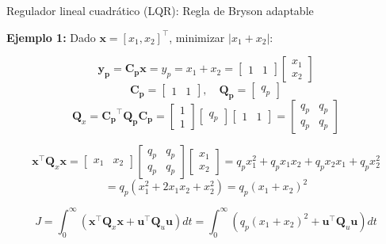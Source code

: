 \documentclass{beamer}
\begin{document}
\begin{frame}{Regulador lineal cuadrático (LQR): Regla de Bryson adaptable}

\textbf{Ejemplo 1:} Dado $\mathbf{x} = [x_1, x_2]^\intercal$, minimizar $|x_1 + x_2|$:

\[
\mathbf{y_p} = \mathbf{C_p} \mathbf{x} = y_p = x_1 + x_2 = \begin{bmatrix}
        1 & 1
    \end{bmatrix}
    \begin{bmatrix}
        x_1 \\ x_2
    \end{bmatrix}
\]
\[
\mathbf{C_p} = \begin{bmatrix}
        1 & 1
    \end{bmatrix}, \quad
\mathbf{Q_p} = \begin{bmatrix}
        q_p
    \end{bmatrix}
\]
\[
\mathbf{Q}_x = \mathbf{C_p}^\intercal \mathbf{Q_p} \mathbf{C_p} = \begin{bmatrix}
        1 \\ 1
    \end{bmatrix}
    \begin{bmatrix}
        q_p
    \end{bmatrix}
    \begin{bmatrix}
        1 & 1
    \end{bmatrix} = \begin{bmatrix}
        q_p & q_p \\
        q_p & q_p
    \end{bmatrix}
\]

\[
\mathbf{x}^\intercal \mathbf{Q}_x \mathbf{x} = \begin{bmatrix}
        x_1 & x_2
    \end{bmatrix}
    \begin{bmatrix}
        q_p & q_p \\
        q_p & q_p
    \end{bmatrix}
    \begin{bmatrix}
        x_1 \\ x_2
    \end{bmatrix}
= q_p x_1^2 + q_p x_1 x_2 + q_p x_2 x_1 + q_p x_2^2
\]
\[
= q_p (x_1^2 + 2 x_1 x_2 + x_2^2)
= q_p (x_1 + x_2)^2
\]

\[
J = \int_0^\infty \left( \mathbf{x}^\intercal \mathbf{Q}_x \mathbf{x} + \mathbf{u}^\intercal \mathbf{Q}_u \mathbf{u} \right) dt = \int_0^\infty \left( q_p (x_1 + x_2)^2 + \mathbf{u}^\intercal \mathbf{Q}_u \mathbf{u} \right) dt
\]

\end{frame}
\end{document}
